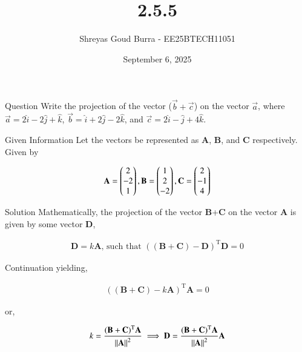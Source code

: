 \documentclass{beamer}
\title %
{2.5.5}
\date{September 6, 2025}
\author 
{Shreyas Goud Burra - EE25BTECH11051}
\begin{document}
\frame{\titlepage}
\begin{frame}{Question}
    Write the projection of the vector ($\vec{b} + \vec{c}$) on the vector $\vec{a}$, where $\vec{a} = 2\hat{i}-2\hat{j}+\hat{k}$, $\vec{b} = \hat{i}+2\hat{j}-2\hat{k}$, and $\vec{c} = 2\hat{i}-\hat{j}+4\hat{k}$.\\
\end{frame}

\begin{frame}{Given Information}
    Let the vectors be represented as \textbf{A}, \textbf{B}, and \textbf{C} respectively. Given by

\begin{align}
    \textbf{A} = \begin{pmatrix}2 \\ -2 \\ 1\end{pmatrix}, \textbf{B} = \begin{pmatrix}1 \\ 2\\ -2\end{pmatrix}, \textbf{C} = \begin{pmatrix}2\\-1\\4\end{pmatrix}
    \label{0.1}
\end{align}
\end{frame}

\begin{frame}{Solution}
    Mathematically, the projection of the vector \textbf{B}+\textbf{C} on the vector \textbf{A} is given by some vector \textbf{D},

\begin{align}
    \textbf{D} = k\textbf{A}\text{, such that } ((\textbf{B}+\textbf{C})-\textbf{D})^\text{T}\textbf{D}=0
    \label{0.2}
\end{align}
\end{frame}

\begin{frame}{Continuation}
    yielding,

\begin{align}
    ((\textbf{B}+\textbf{C})-k\textbf{A})^\text{T}\textbf{A}=0
    \label{0.3}
\end{align}

or,


\begin{align}
    k=\frac{(\textbf{B}+\textbf{C})^\text{T}\textbf{A}}{\left\lVert\textbf{A}\right\rVert^2} \implies \textbf{D} = \frac{(\textbf{B}+\textbf{C})^\text{T}\textbf{A}}{\left\lVert\textbf{A}\right\rVert^2}\textbf{A}
    \label{0.4}
\end{align}
\end{frame}
\end{document}
